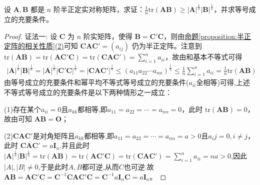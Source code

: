 \documentclass[../../main.tex]{subfiles}
\begin{document}
\begin{proposition}\label{proposition:半正定阵的迹与行列式相关不等式}
设 \(\boldsymbol{A},\boldsymbol{B}\) 都是 \(n\) 阶半正定实对称矩阵，求证：\(\frac{1}{n}\mathrm{tr}(\boldsymbol{A}\boldsymbol{B})\geq|\boldsymbol{A}|^{\frac{1}{n}}|\boldsymbol{B}|^{\frac{1}{n}}\)，并求等号成立的充要条件。
\end{proposition}
\begin{proof}
{\color{blue}证法一:}
设 \(\boldsymbol{C}\) 为 \(n\) 阶实矩阵，使得 \(\boldsymbol{B}=\boldsymbol{C}'\boldsymbol{C}\)，则由\hyperref[proposition:半正定阵的相关性质]{命题\ref{proposition:半正定阵的相关性质}(2)}可知 \(\boldsymbol{C}\boldsymbol{A}\boldsymbol{C}'=(a_{ij})\) 仍为半正定阵。注意到 \(\mathrm{tr}(\boldsymbol{A}\boldsymbol{B})=\mathrm{tr}(\boldsymbol{A}\boldsymbol{C}'\boldsymbol{C})=\mathrm{tr}(\boldsymbol{C}\boldsymbol{A}\boldsymbol{C}')=\sum_{i = 1}^{n}a_{ii}\)，故由和基本不等式可得
\begin{align*}
|\boldsymbol{A}|^{\frac{1}{n}}|\boldsymbol{B}|^{\frac{1}{n}}=|\boldsymbol{A}|^{\frac{1}{n}}|\boldsymbol{C}'\boldsymbol{C}|^{\frac{1}{n}}=|\boldsymbol{C}\boldsymbol{A}\boldsymbol{C}'|^{\frac{1}{n}}\leq(a_{11}a_{22}\cdots a_{nn})^{\frac{1}{n}}\leq\frac{1}{n}\sum_{i = 1}^{n}a_{ii}=\frac{1}{n}\mathrm{tr}(\boldsymbol{A}\boldsymbol{B})
\end{align*}
由等号成立的充要条件和幂平均不等式等号成立的充要条件($a_{ii}$全相等)可得,上述不等式等号成立的充要条件是以下两种情形之一成立：

(1)存在某个$a_{ii}=0$且$a_{kk}$都相等,即\(a_{11}=a_{22}=\cdots=a_{nn}=0\)，此时 \(\mathrm{tr}(\boldsymbol{A}\boldsymbol{B}) = 0\)，故由可知 \(\boldsymbol{A}\boldsymbol{B}=\boldsymbol{O}\)；

(2)$\boldsymbol{C}\boldsymbol{A}\boldsymbol{C}'$是对角矩阵且$a_{kk}$都相等,即\(a_{11}=a_{22}=\cdots=a_{nn}=a>0\)且$a_ij=0,i\ne j$，此时
\(\boldsymbol{C}\boldsymbol{A}\boldsymbol{C}'=a\boldsymbol{I}_n\).并且此时\(|\boldsymbol{A}|^{\frac{1}{n}}|\boldsymbol{B}|^{\frac{1}{n}}=\mathrm{tr}(\boldsymbol{A}\boldsymbol{B})=\mathrm{tr}(\boldsymbol{A}\boldsymbol{C}'\boldsymbol{C})=\mathrm{tr}(\boldsymbol{C}\boldsymbol{A}\boldsymbol{C}')=\sum_{i = 1}^{n}a_{ii}=na>0\),因此$|A|,|B|\ne0$,于是此时$A,B$都可逆,从而$C$也可逆.故 \(\boldsymbol{AB}=\boldsymbol{AC}' \boldsymbol{C}=\boldsymbol{C}^{-1}\boldsymbol{CAC}' \boldsymbol{C}=\boldsymbol{C}^{-1}a\boldsymbol{I}_n\boldsymbol{C}=a\boldsymbol{I}_n\)。


\end{proof}
\end{document}
